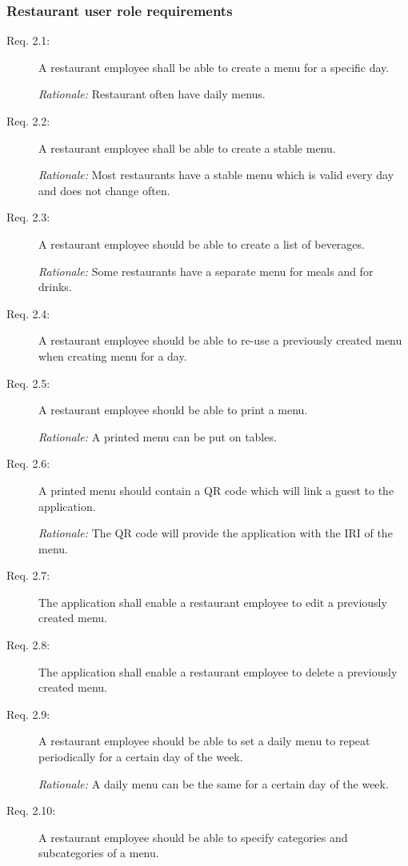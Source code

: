 \subsubsection{Restaurant user role requirements}
\begin{description}
    \item [Req. 2.1:] A restaurant employee shall be able to create a menu for a specific day.

    \emph{Rationale:} Restaurant often have daily menus.
    \item [Req. 2.2:] A restaurant employee shall be able to create a stable menu.

    \emph{Rationale:} Most restaurants have a stable menu which is valid every day and does not change often.
    \item [Req. 2.3:] A restaurant employee should be able to create a list of beverages.

    \emph{Rationale:} Some restaurants have a separate menu for meals and for drinks.
    \item [Req. 2.4:] A restaurant employee should be able to re-use a previously created menu when creating menu for a day.
    \item [Req. 2.5:] A restaurant employee should be able to print a menu.

    \emph{Rationale:} A printed menu can be put on tables.
    \item [Req. 2.6:] A printed menu should contain a QR code which will link a guest to the application.

    \emph{Rationale:} The QR code will provide the application with the IRI of the menu.
    \item [Req. 2.7:] The application shall enable a restaurant employee to edit a previously created menu.
    \item [Req. 2.8:] The application shall enable a restaurant employee to delete a previously created menu.
    \item [Req. 2.9:] A restaurant employee should be able to set a daily menu to repeat periodically for a certain day of the week.

    \emph{Rationale:} A daily menu can be the same for a certain day of the week.
    \item [Req. 2.10:] A restaurant employee should be able to specify categories and subcategories of a menu.


\end{description}
